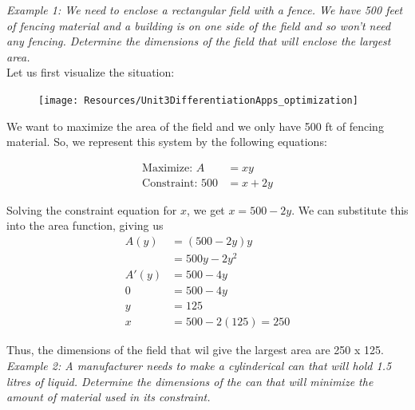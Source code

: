         \noindent \color{blue} \textit{Example 1: We need to enclose a rectangular field with a
        fence. We have 500 feet of fencing material and a building is on one side of the field
        and so won't need any fencing. Determine the dimensions of the field that will enclose the
        largest area.} \color{black} \\

        \noindent Let us first visualize the situation:

        \begin{figure}
            \centering
            \texttt{[image: Resources/Unit3DifferentiationApps\_optimization]}
        \end{figure}

        \noindent We want to maximize the area of the field and we only have 500 ft of fencing
        material. So, we represent this system by the following equations:

        \begin{align*}
            \text{Maximize: } A     &= xy \\
            \text{Constraint: } 500 &= x + 2y
        \end{align*}

        \noindent Solving the constraint equation for $x$, we get $x=500-2y$. We can substitute this
        into the area function, giving us \\

        \begin{align*}
            A(y)  &= (500-2y)y \\
            &= 500y-2y^2 \\
            A'(y) &= 500-4y \\
            0     &= 500 - 4y \\
            y     &= 125 \\
            x     &= 500-2(125) = 250
        \end{align*}

        \noindent Thus, the dimensions of the field that wil give the largest area are 250 x 125. \\

        \noindent \color{blue} \textit{Example 2: A manufacturer needs to make a cylinderical can
        that will hold 1.5 litres of liquid. Determine the dimensions of the can that will
        minimize the amount of material used in its constraint.} \color{black} \\

